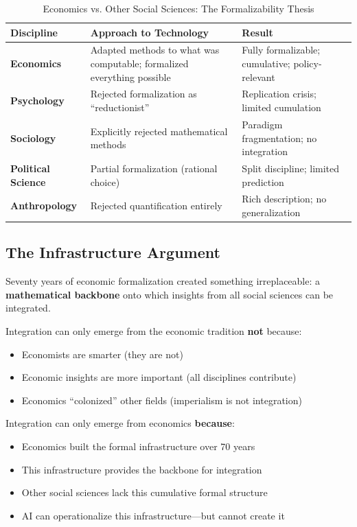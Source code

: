 \documentclass[12pt,a4paper]{article}
\begin{document}
\begin{table}[H]
\centering
\caption{Economics vs. Other Social Sciences: The Formalizability Thesis}
\label{tab:formalizability}
\renewcommand{\arraystretch}{1.3}
\small
\begin{tabular}{@{}p{3cm}p{4.5cm}p{4.5cm}@{}}
\toprule
\textbf{Discipline} & \textbf{Approach to Technology} & \textbf{Result} \\
\midrule
\textbf{Economics} & Adapted methods to what was computable; formalized everything possible & Fully formalizable; cumulative; policy-relevant \\
\textbf{Psychology} & Rejected formalization as ``reductionist'' & Replication crisis; limited cumulation \\
\textbf{Sociology} & Explicitly rejected mathematical methods & Paradigm fragmentation; no integration \\
\textbf{Political Science} & Partial formalization (rational choice) & Split discipline; limited prediction \\
\textbf{Anthropology} & Rejected quantification entirely & Rich description; no generalization \\
\bottomrule
\end{tabular}
\end{table}

\subsection{The Infrastructure Argument}

Seventy years of economic formalization created something irreplaceable: a \textbf{mathematical backbone} onto which insights from all social sciences can be integrated.

Integration can only emerge from the economic tradition \textbf{not} because:
\begin{itemize}[nosep]
\item Economists are smarter (they are not)
\item Economic insights are more important (all disciplines contribute)
\item Economics ``colonized'' other fields (imperialism is not integration)
\end{itemize}

Integration can only emerge from economics \textbf{because}:
\begin{itemize}[nosep]
\item Economics built the formal infrastructure over 70 years
\item This infrastructure provides the backbone for integration
\item Other social sciences lack this cumulative formal structure
\item AI can operationalize this infrastructure---but cannot create it
\end{itemize}
\end{document}
